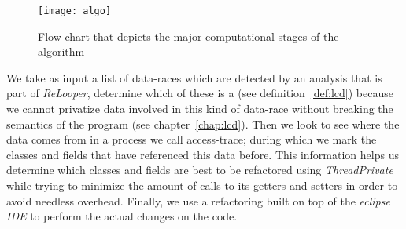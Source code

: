 \begin{figure}[h!]
	\begin{center}
		\texttt{[image: algo]}
		\caption{Flow chart that depicts the major
		computational stages of the algorithm}
		\label{fig:generalalgo}
	\end{center}
\end{figure}

We take as input a list of data-races which are detected by an analysis that is
part of \emph{ReLooper}, determine which of these is a \slcd (see
definition~\ref{def:lcd}) because we cannot privatize data involved in this kind
of data-race without breaking the semantics of the program (see
chapter~\ref{chap:lcd}). Then we look to see where the data comes from in a
process we call access-trace; during which we mark the classes and fields that
have referenced this data before. This information helps us determine which
classes and fields are best to be refactored using \emph{ThreadPrivate} while
trying to minimize the amount of calls to its getters and setters in order to
avoid needless overhead.
Finally, we use a refactoring built on top of the \emph{eclipse IDE} to perform
the actual changes on the code.